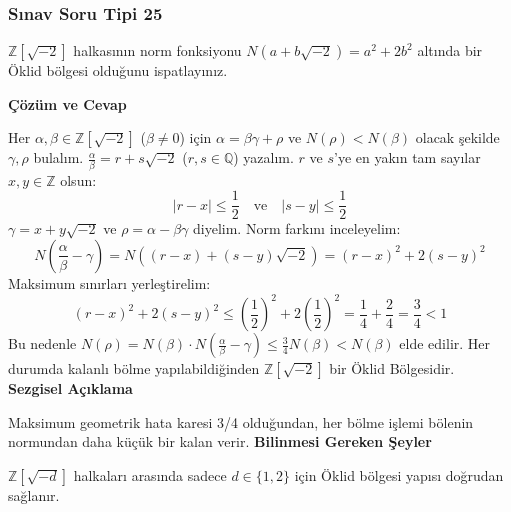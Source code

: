 \documentclass[11pt, a4paper]{article}
\newenvironment{cozum}{
    \vspace{0.5cm}
    \noindent\textcolor{green!60!black}{\faCheckCircle\enspace \textbf{\Large Çözüm ve Cevap}}\par\vspace{0.2cm}
}{}
\newenvironment{sezgisel}{
    \vspace{0.5cm}
    \noindent\textcolor{orange!80!black}{\faLightbulb\enspace \textbf{\Large Sezgisel Açıklama}}\par\vspace{0.2cm}
    \itshape
}{}
\newenvironment{bilgi}{
    \vspace{0.5cm}
    \noindent\textcolor{red!70!black}{\faExclamationTriangle\enspace \textbf{\Large Bilinmesi Gereken Şeyler}}\par\vspace{0.2cm}
}{}
\begin{document}
\subsubsection{Sınav Soru Tipi 25}
\begin{sinavbox}
$\mathbb{Z}[\sqrt{-2}]$ halkasının norm fonksiyonu $N(a+b\sqrt{-2}) = a^2+2b^2$ altında bir Öklid bölgesi olduğunu ispatlayınız.
\end{sinavbox}
\begin{cozum}
Her $\alpha, \beta \in \mathbb{Z}[\sqrt{-2}]$ ($\beta \neq 0$) için $\alpha = \beta\gamma+\rho$ ve $N(\rho) < N(\beta)$ olacak şekilde $\gamma, \rho$ bulalım.
$\frac{\alpha}{\beta} = r + s\sqrt{-2}$ ($r, s \in \mathbb{Q}$) yazalım.
$r$ ve $s$'ye en yakın tam sayılar $x, y \in \mathbb{Z}$ olsun:
\[ |r-x| \le \frac{1}{2} \quad \text{ve} \quad |s-y| \le \frac{1}{2} \]
$\gamma = x + y\sqrt{-2}$ ve $\rho = \alpha - \beta\gamma$ diyelim.
Norm farkını inceleyelim:
\[ N\left( \frac{\alpha}{\beta} - \gamma \right) = N((r-x) + (s-y)\sqrt{-2}) = (r-x)^2 + 2(s-y)^2 \]
Maksimum sınırları yerleştirelim:
\[ (r-x)^2 + 2(s-y)^2 \le \left(\frac{1}{2}\right)^2 + 2\left(\frac{1}{2}\right)^2 = \frac{1}{4} + \frac{2}{4} = \frac{3}{4} < 1 \]
Bu nedenle $N(\rho) = N(\beta) \cdot N(\frac{\alpha}{\beta} - \gamma) \le \frac{3}{4} N(\beta) < N(\beta)$ elde edilir.
Her durumda kalanlı bölme yapılabildiğinden $\mathbb{Z}[\sqrt{-2}]$ bir Öklid Bölgesidir.
\end{cozum}
\begin{sezgisel}
Maksimum geometrik hata karesi 3/4 olduğundan, her bölme işlemi bölenin normundan daha küçük bir kalan verir.
\end{sezgisel}
\begin{bilgi}
$\mathbb{Z}[\sqrt{-d}]$ halkaları arasında sadece $d \in \{1, 2\}$ için Öklid bölgesi yapısı doğrudan sağlanır.
\end{bilgi}

\newpage
\end{document}
